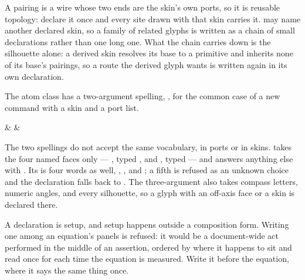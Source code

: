 A pairing is a wire whose two ends are the skin's own ports, so it is
reusable topology: declare it once and every site drawn with that skin
carries it.   may name another declared skin, so a family of
related glyphs is written as a chain of small declarations rather than
one long one.  What the chain carries down is the silhouette alone: a
derived skin resolves its base to a primitive and inherits none of its
base's pairings, so a route the derived glyph wants is written again in
its own declaration.

The atom class has a two-argument spelling, , for the
common case of a new command with a skin and a port list.

\begin{tnexample}[
  caption={a declared atom command},
  index={The declaration adds one word to the atom class; the picture
    then spells it like any other atom.  The port list is complete: an
    anchor without a type is not an extension contract.},
  signature={kernel-boundary|signature=open:e, open:w, phys:n}]
\begin{tenkz}[rows={wire}, cols=3, west=open, east=open]
   &  & 
\end{tenkz}
\end{tnexample}

\dbendpar The two spellings do not accept the same vocabulary, in ports
or in skins.   takes the four named faces only ---
,  typed , and ,
 typed  --- and answers anything else with
.  Its  is four words as
well, , ,  and ; a fifth is
refused as an unknown choice and the declaration falls back to
.  The three-argument  also
takes compass letters, numeric angles, and every silhouette, so a glyph
with an off-axis face or a  skin is declared there.

A declaration is setup, and setup happens outside a composition form.
Writing one among an equation's panels is refused: it would be a
document-wide act performed in the middle of an assertion, ordered by
where it happens to sit and read once for each time the equation is
measured.  Write it before the equation, where it says the same thing
once.

